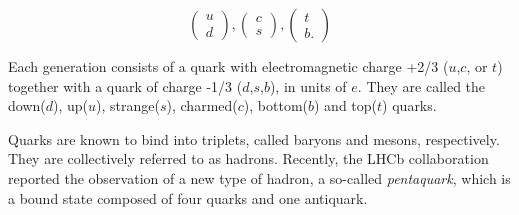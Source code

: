 \begin{equation}
	\begin{pmatrix}
		u\\
		d
	\end{pmatrix},
\begin{pmatrix}
		c\\
		s
	\end{pmatrix},
	\begin{pmatrix}
		t\\
		b.
	\end{pmatrix}
\end{equation}

Each generation consists of a quark with electromagnetic charge +2/3 ($u$,$c$, or $t$) together with a quark of charge -1/3 ($d$,$s$,$b$), in units of $e$. They are called the down($d$), up($u$), strange($s$), charmed($c$), bottom($b$) and top($t$) quarks. 

Quarks are known to bind into triplets, called baryons and mesons, respectively. They are collectively referred to as hadrons. Recently, the LHCb collaboration reported the observation of a new type of hadron, a so-called \textit{pentaquark}, which is a bound state composed of four quarks and one antiquark\cite{PhysRevLett.115.072001}.






